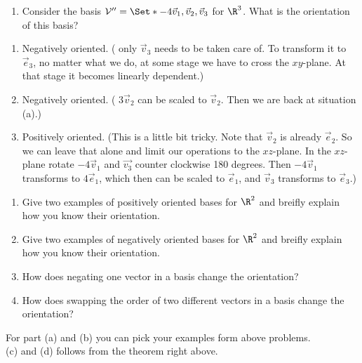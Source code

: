 \begin{exercises}
\begin{problist}
\begin{enumerate}
			\item Consider the basis $\mathcal V'' = \Set*{-4\vec v_1,
				\vec v_2, \vec v_3}$ for $\R^{3}$. What is the
				orientation of this basis?
		\end{enumerate}
		\begin{solution}
			\begin{enumerate}
				\item Negatively oriented. ( only $\vec{v}_3$ needs to be taken care of. To transform it to $\vec{e}_3$, no matter what we do,
					at some stage we have to cross the $xy$-plane. At that stage it becomes linearly dependent.)
				\item Negatively oriented. ( $3\vec{v}_2$ can be scaled to $\vec{v}_2$. Then we are back at situation (a).)
				\item Positively oriented. (This is a little bit tricky. Note that $\vec{v}_2$ is already $\vec{e}_2$. So we can leave that 
					alone and limit our operations to the $xz$-plane. In the $xz$-plane rotate $-4 \vec{v}_1$ and $\vec{v_3}$ counter 
					clockwise 180 degrees. Then $-4 \vec{v}_1$ transforms to $4 \vec{e}_1$, which then can be scaled to $\vec{e}_1$, and 
					$\vec{v}_3$ transforms to $\vec{e}_3$.)
			\end{enumerate}
		\end{solution}

		\prob
		\begin{enumerate}
			\item Give two examples of positively oriented bases for
				$\R^{2}$ and breifly explain how you know their orientation.

			\item Give two examples of negatively oriented bases for
				$\R^{2}$ and breifly explain how you know their orientation.

			\item How does negating one vector in a basis change the
				orientation?

			\item How does swapping the order of two different vectors
				in a basis change the orientation?
		\end{enumerate}
		\begin{solution}
			For part (a) and (b) you can pick your examples form above problems.\\
			(c) and (d) follows from the theorem right above.
		\end{solution}
	\end{problist}
\end{exercises}
